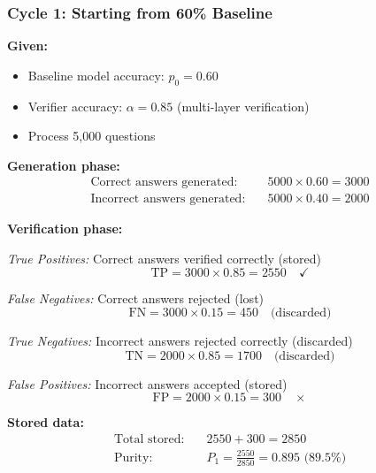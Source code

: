 \documentclass[12pt,a4paper]{article}
\theoremstyle{definition}
\begin{document}
\subsubsection{Cycle 1: Starting from 60\% Baseline}

\begin{examplebox}[title=Cycle 1 Detailed Calculation]

\textbf{Given:}
\begin{itemize}
    \item Baseline model accuracy: $p_0 = 0.60$
    \item Verifier accuracy: $\alpha = 0.85$ (multi-layer verification)
    \item Process 5,000 questions
\end{itemize}

\textbf{Generation phase:}
\begin{align}
\text{Correct answers generated:} \quad & 5000 \times 0.60 = 3000 \\
\text{Incorrect answers generated:} \quad & 5000 \times 0.40 = 2000
\end{align}

\textbf{Verification phase:}

\textit{True Positives:} Correct answers verified correctly (stored)
\begin{equation}
\text{TP} = 3000 \times 0.85 = 2550 \quad \checkmark
\end{equation}

\textit{False Negatives:} Correct answers rejected (lost)
\begin{equation}
\text{FN} = 3000 \times 0.15 = 450 \quad \text{(discarded)}
\end{equation}

\textit{True Negatives:} Incorrect answers rejected correctly (discarded)
\begin{equation}
\text{TN} = 2000 \times 0.85 = 1700 \quad \text{(discarded)}
\end{equation}

\textit{False Positives:} Incorrect answers accepted (stored)
\begin{equation}
\text{FP} = 2000 \times 0.15 = 300 \quad \times
\end{equation}

\textbf{Stored data:}
\begin{align}
\text{Total stored:} \quad & 2550 + 300 = 2850 \\
\text{Purity:} \quad & P_1 = \frac{2550}{2850} = 0.895 \text{ (89.5\%)}
\end{align}


\end{examplebox}
\end{document}
